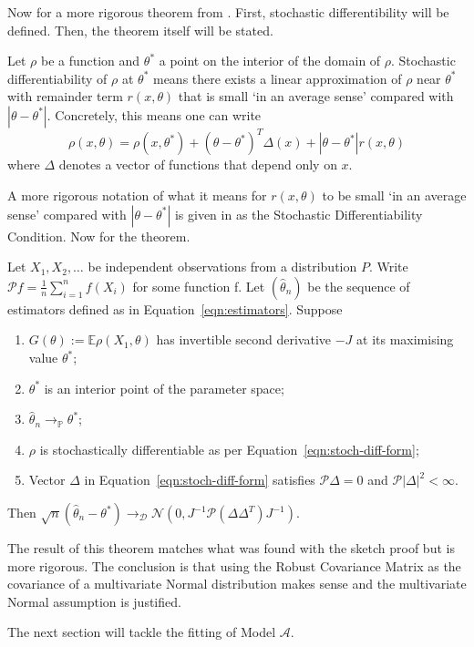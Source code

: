 Now for a more rigorous theorem from \cite{pollard_1985}. First, stochastic differentibility will be defined. Then, the theorem itself will be stated.

\begin{definition}
    Let $\rho$ be a function and $\theta^*$ a point on the interior of the domain of $\rho$. Stochastic differentiability of $\rho$ at $\theta^*$ means there exists a linear approximation of $\rho$ near $\theta^*$ with remainder term $r(x,\theta)$ that is small `in an average sense' compared with $|\theta - \theta^*|$. Concretely, this means one can write
    \begin{equation}
        \label{eqn:stoch-diff-form}
        \rho(x, \theta) = \rho(x, \theta^*) + (\theta - \theta^*)^T \Delta(x) + |\theta - \theta^*|r(x,\theta)
    \end{equation}
    where $\Delta$ denotes a vector of functions that depend only on $x$.
\end{definition}

A more rigorous notation of what it means for $r(x,\theta)$ to be small `in an average sense' compared with $|\theta - \theta^*|$ is given in \cite{pollard_1985} as the Stochastic Differentiability Condition. Now for the theorem.

\begin{theorem}
\label{the:aymp}
    Let $X_1, X_2, \ldots$ be independent observations from a distribution $P$. Write $\mathcal{P}f = \frac{1}{n} \sum_{i=1}^n f(X_i)$ for some function f. Let $(\hat{\theta}_n)$ be the sequence of estimators defined as in Equation~\ref{eqn:estimators}. Suppose
    \begin{enumerate}
        \item $G(\theta) := \mathbb{E}\rho(X_1, \theta)$ has invertible second derivative $-J$ at its maximising value $\theta^*$;
        \item $\theta^*$ is an interior point of the parameter space;
        \item $\hat{\theta}_n \to_{\mathbb{P}} \theta^*$;
        \item $\rho$ is stochastically differentiable as per Equation~\ref{eqn:stoch-diff-form};
        \item Vector $\Delta$ in Equation~\ref{eqn:stoch-diff-form} satisfies $\mathcal{P}\Delta = 0$ and $\mathcal{P}|\Delta|^2 < \infty$.
    \end{enumerate}
    Then $\sqrt{n}(\hat{\theta}_n - \theta^*) \to_{\mathcal{D}} \mathcal{N}(0, J^{-1}\mathcal{P}(\Delta \Delta^T)J^{-1})$.
\end{theorem}

The result of this theorem matches what was found with the sketch proof but is more rigorous. The conclusion is that using the Robust Covariance Matrix as the covariance of a multivariate Normal distribution makes sense and the multivariate Normal assumption is justified.

The next section will tackle the fitting of Model $\mathcal{A}$.